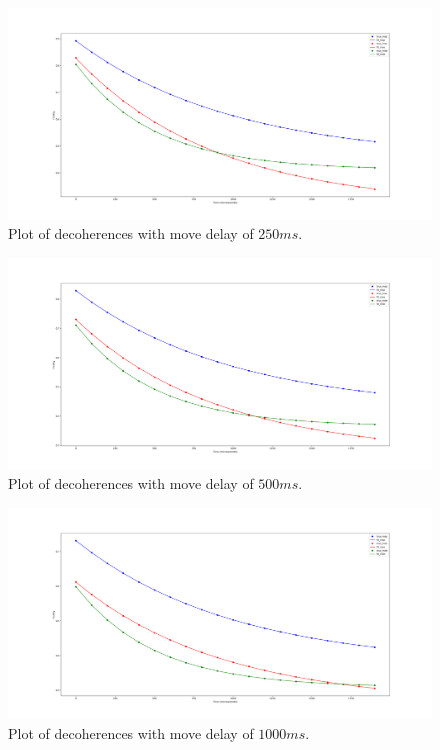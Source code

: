\documentclass{article}
\begin{document}
\begin{figure}[!htb]
    \centering
    \includegraphics[width=\textwidth]{figures/decoherence_move_delay_250ms.png}
    \caption{Plot of decoherences with move delay of $250ms$.}
    \label{fig:decoherence_250_delay}
\end{figure}

\begin{figure}[!htb]
    \centering
    \includegraphics[width=\textwidth]{figures/decoherence_move_delay_500ms.png}
    \caption{Plot of decoherences with move delay of $500ms$.}
    \label{fig:decoherence_500_delay}
\end{figure}

\begin{figure}[!htb]
    \centering
    \includegraphics[width=\textwidth]{figures/decoherence_move_delay_1000ms.png}
    \caption{Plot of decoherences with move delay of $1000ms$.}
    \label{fig:decoherence_1000_delay}
\end{figure}
\end{document}
